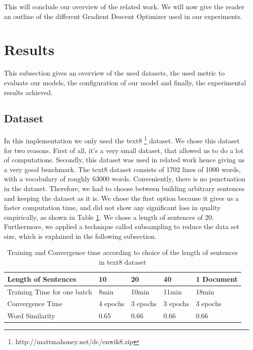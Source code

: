 \documentclass[conference]{IEEEtran}
\begin{document}
This will conclude our overview of the related work. We will now give the reader an outline of the different Gradient Descent Optimizer used in our experiments.

\section{Results}\label{chap:results}


This subsection gives an overview of the used datasets, the used metric to evaluate our models, the configuration of our model and finally, the experimental results achieved.

\subsection{Dataset}\label{sec:dataset}
In this implementation we only used the text8 \footnote{http://mattmahoney.net/dc/enwik8.zip} dataset. We chose this dataset for two reasons. First of all, it's a very small dataset, that allowed us to do a lot of computations. Secondly, this dataset was used in related work \cite{intel} hence giving us a very good benchmark. The text8 dataset consists of 1702 lines of 1000 words, with a vocabulary of roughly 63000 words. Conveniently, there is no punctuation in the dataset. Therefore, we had to choose between building arbitrary sentences and keeping the dataset as it is. We chose the first option because it gives us a faster computation time, and did not show any significant loss in quality empirically, as shown in Table \ref{table:with_20}. We chose a length of sentences of 20. Furthermore, we applied a technique called subsampling to reduce the data set size, which is explained in the following subsection.

\begin{table}[]
\centering
\begin{tabular}{|l|l|l|l|l|}
\hline
Length of Sentences & 10 & 20 & 40 & 1 Document \\ \hline
Training Time for one batch &8min & 10min & 11min & 18min \\ \hline
Convergence Time &4 epochs & 3 epochs & 3 epochs & 3 epochs \\ \hline
Word Similarity& 0.65 & 0.66 & 0.66 & 0.66 \\ \hline
\end{tabular}
\caption{Training and Convergence time according to choice of the length of sentences in text8 dataset}
\label{table:with_20}
\end{table}
\end{document}
